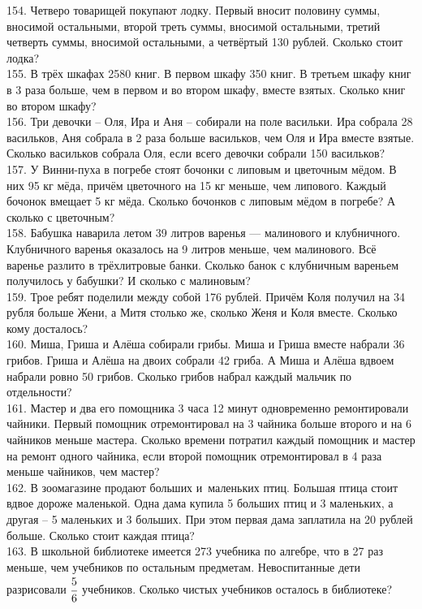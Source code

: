 154. Четверо товарищей покупают лодку. Первый вносит половину суммы, вносимой остальными, второй треть суммы, вносимой остальными, третий четверть суммы, вносимой остальными, а четвёртый 130 рублей. Сколько стоит лодка?\\
155. В трёх шкафах 2580 книг. В первом шкафу 350 книг. В третьем шкафу книг в 3 раза  больше, чем в первом и во втором шкафу, вместе взятых. Сколько книг во втором шкафу?\\
156. Три девочки – Оля, Ира и Аня – собирали на поле васильки. Ира собрала 28 васильков, Аня собрала в 2 раза больше васильков, чем Оля и Ира вместе взятые. Сколько васильков собрала Оля, если всего девочки собрали 150 васильков?\\
157. У Винни-пуха в погребе стоят бочонки с липовым и цветочным мёдом. В них 95 кг мёда, причём цветочного на 15 кг меньше, чем липового. Каждый бочонок вмещает 5 кг мёда. Сколько бочонков с липовым мёдом в погребе? А сколько с цветочным?\\
158. Бабушка наварила летом 39 литров варенья --- малинового и клубничного. Клубничного варенья оказалось на 9 литров меньше, чем малинового. Всё варенье разлито в трёхлитровые банки. Сколько банок с клубничным вареньем получилось у бабушки? И сколько с малиновым?\\
159. Трое ребят поделили между собой 176 рублей. Причём Коля получил на 34 рубля больше Жени, а Митя столько же, сколько Женя и Коля вместе. Сколько кому досталось?\\
160. Миша, Гриша и Алёша собирали грибы. Миша и Гриша вместе набрали 36 грибов. Гриша и Алёша на двоих собрали 42 гриба. А Миша и Алёша вдвоем набрали ровно 50 грибов. Сколько грибов набрал каждый мальчик по отдельности?\\
161. Мастер и два его помощника 3 часа 12 минут одновременно ремонтировали чайники. Первый помощник отремонтировал на 3 чайника больше второго и на 6 чайников меньше мастера. Сколько времени потратил каждый помощник и мастер на ремонт одного чайника, если второй помощник отремонтировал в 4 раза меньше чайников, чем мастер?\\
162. В зоомагазине продают больших и маленьких птиц. Большая птица стоит вдвое дороже маленькой. Одна дама купила 5 больших птиц и 3 маленьких, а другая – 5 маленьких и 3 больших. При этом первая дама заплатила на 20 рублей больше. Сколько стоит каждая птица?\\
163. В школьной библиотеке имеется 273 учебника по алгебре, что в 27 раз меньше, чем учебников по остальным предметам. Невоспитанные дети разрисовали $\cfrac{5}{6}$  учебников. Сколько чистых учебников осталось в библиотеке?\\
